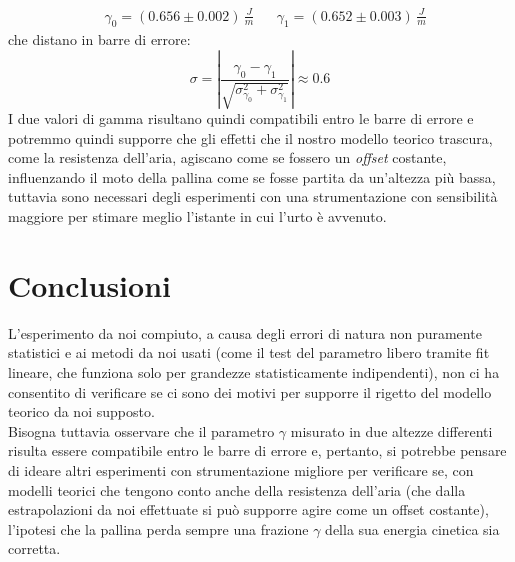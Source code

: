 \documentclass{article}
\begin{document}
\begin{align*}
	&\gamma_0 = (0.656 \pm 0.002) \, \unit{\frac{J}{m}} & &\gamma_1 = (0.652 \pm 0.003) \, \unit{\frac{J}{m}}
\end{align*}
che distano in barre di errore:
$$
	\sigma = \left| \frac{\gamma_0 - \gamma_1}{\sqrt{\sigma^2_{\gamma_0} + \sigma^2_{\gamma_1}}} \right| \approx 0.6
$$
I due valori di gamma risultano quindi compatibili entro le barre di errore e potremmo quindi supporre che gli effetti che il nostro modello teorico trascura, come la resistenza dell'aria, agiscano come se fossero un \emph{offset} costante, influenzando il moto della pallina come se fosse partita da un'altezza più bassa, tuttavia sono necessari degli esperimenti con una strumentazione con sensibilità maggiore per stimare meglio l'istante in cui l'urto è avvenuto.

\section{Conclusioni}

L'esperimento da noi compiuto, a causa degli errori di natura non puramente statistici e ai metodi da noi usati (come il test del parametro libero tramite fit lineare, che funziona solo per grandezze statisticamente indipendenti), non ci ha consentito di verificare se ci sono dei motivi per supporre il rigetto del modello teorico da noi supposto. \\
Bisogna tuttavia osservare che il parametro $\gamma$ misurato in due altezze differenti risulta essere compatibile entro le barre di errore e, pertanto, si potrebbe pensare di ideare altri esperimenti con strumentazione migliore per verificare se, con modelli teorici che tengono conto anche della resistenza dell'aria (che dalla estrapolazioni da noi effettuate si può supporre agire come un offset costante), l'ipotesi che la pallina perda sempre una frazione $\gamma$ della sua energia cinetica sia corretta. 
\end{document}
